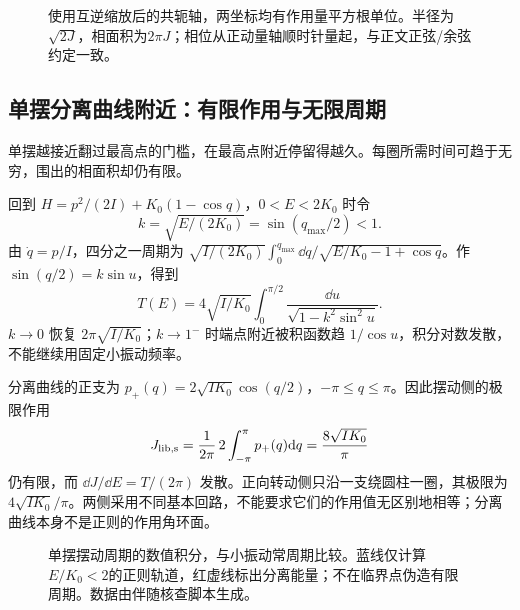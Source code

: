 \begin{figure}[htbp]
\centering
{}
\caption{使用互逆缩放后的共轭轴，两坐标均有作用量平方根单位。半径为$\sqrt{2J}$，相面积为$2\pi J$；相位从正动量轴顺时针量起，与正文正弦/余弦约定一致。}
\label{fig:ham-action-angle}
\end{figure}

\subsection{单摆分离曲线附近：有限作用与无限周期}
单摆越接近翻过最高点的门槛，在最高点附近停留得越久。每圈所需时间可趋于无穷，围出的相面积却仍有限。

\begin{example}[周期发散不要求相面积发散]
回到 $H=p^2/(2I)+K_0(1-\cos q)$，$0<E<2K_0$ 时令
\[
k=\sqrt{E/(2K_0)}=\sin(q_{\max}/2)<1.
\]
由 $\dot q=p/I$，四分之一周期为 $\sqrt{I/(2K_0)}\int_0^{q_{\max}}\dd q/\sqrt{E/K_0-1+\cos q}$。作 $\sin(q/2)=k\sin u$，得到
\[
T(E)=4\sqrt{I/K_0}\int_0^{\pi/2}\frac{\dd u}{\sqrt{1-k^2\sin^2u}}.
\]
$k\to0$ 恢复 $2\pi\sqrt{I/K_0}$；$k\to1^-$ 时端点附近被积函数趋 $1/\cos u$，积分对数发散，不能继续用固定小振动频率。

分离曲线的正支为 $p_+(q)=2\sqrt{IK_0}\cos(q/2)$，$-\pi\le q\le\pi$。因此摆动侧的极限作用
\[
J_{\rm lib,s}=\frac1{2\pi}\,2\int_{-\pi}^{\pi}p_+(q)\mathrm{d} q
=\frac{8\sqrt{IK_0}}\pi
\]
仍有限，而 $\dd J/\dd E=T/(2\pi)$ 发散。正向转动侧只沿一支绕圆柱一圈，其极限为 $4\sqrt{IK_0}/\pi$。两侧采用不同基本回路，不能要求它们的作用值无区别地相等；分离曲线本身不是正则的作用角环面。
\end{example}

\begin{figure}[htbp]
\centering
{}
\caption{单摆摆动周期的数值积分，与小振动常周期比较。蓝线仅计算$E/K_0<2$的正则轨道，红虚线标出分离能量；不在临界点伪造有限周期。数据由伴随核查脚本生成。}
\label{fig:ham-pendulum-period}
\end{figure}

